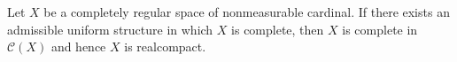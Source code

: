 Let $X$ be a completely regular space of nonmeasurable cardinal. If there exists an admissible uniform structure in which $X$ is complete, then $X$ is complete in $\mathcal{C}(X)$ and hence $X$ is realcompact.
